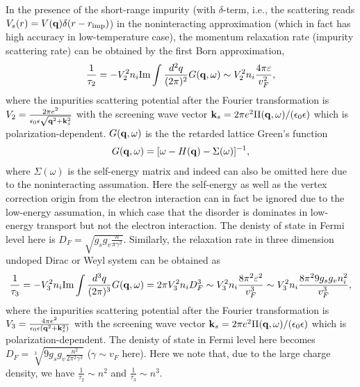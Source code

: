 \documentclass[UTF8,a4paper]{article}
\begin{document}
\begin{large}
In the presence of the short-range impurity (with $\delta$-term, i.e., the scattering reads $V_{s}(r)=V({\bf q})\delta(r-r_{{\rm imp}})$) 
in the noninteracting approximation
(which in fact has high accuracy in low-temperature case),
the momentum relaxation rate (impurity scattering rate) can be obtained by the first Born approximation,
\begin{equation} 
\begin{aligned}
\frac{1}{\tau_{2}}=-V^{2}_{2}n_{i}{\rm Im}\int\frac{d^{2}q}{(2\pi)^{2}}G({\bf q},\omega)
\sim V^{2}_{2}n_{i}\frac{4\pi\varepsilon}{v_{F}^{2}},
\end{aligned}
\end{equation}
where
the impurities scattering potential after the Fourier transformation is $V_{2}=\frac{2\pi e^{2}}
{\epsilon_{0}\epsilon\sqrt{{\bf q}^{2}+{\bf k}_{s}^{2}}}$
with the screening wave vector ${\bf k}_{s}=2\pi e^{2}\Pi({\bf q},\omega)/(\epsilon_{0}\epsilon)$ which is polarization-dependent.
$G({\bf q},\omega)$ is the the retarded lattice Green's function
\begin{equation} 
\begin{aligned}
G({\bf q},\omega)=[\omega-H({\bf q})-\Sigma(\omega)]^{-1},
\end{aligned}
\end{equation}
where $\Sigma(\omega)$ is the self-energy matrix
and indeed can also be omitted here due to the noninteracting assumation.
Here the self-energy as well as the vertex correction origin from the electron interaction can in fact be ignored due to the low-energy
assumation,
in which case that the disorder is dominates in low-energy transport but not the electron interaction\cite{Burkov A A}.
The denisty of state in Fermi level here is $D_{F}=\sqrt{g_{s}g_{v}\frac{n}{\pi\gamma^{2}}}$.
Similarly, the relaxation rate in three dimension undoped Dirac or Weyl system can be obtained as
\begin{equation} 
\begin{aligned}
\frac{1}{\tau_{3}}=-V_{3}^{2}n_{i}{\rm Im}\int\frac{d^{3}q}{(2\pi)^{3}}G({\bf q},\omega)=2\pi V_{3}^{2}n_{i}D_{F}^{3}
\sim V_{3}^{2}n_{i}\frac{8\pi^{2}\varepsilon^{2}}{v^{3}_{F}}
\sim V_{3}^{2}n_{i}\frac{8\pi^{2}9g_{s}g_{v}n_{i}^{2}}{v^{3}_{F}},
\end{aligned}
\end{equation}
where
the impurities scattering potential after the Fourier transformation is $V_{3}=\frac{4\pi e^{2}}
{\epsilon_{0}\epsilon({\bf q}^{2}+{\bf k}_{s}^{2})}$
with the screening wave vector ${\bf k}_{s}=2\pi e^{2}\Pi({\bf q},\omega)/(\epsilon_{0}\epsilon)$ which is polarization-dependent.
The denisty of state in Fermi level here becomes $D_{F}=\sqrt[3]{9g_{s}g_{v}\frac{n^{2}}{2\pi^{2}\gamma^{3}}}$
($\gamma\sim v_{F}$ here).
Here we note that, due to the large charge density,
we have $\frac{1}{\tau_{2}}\sim n^{2}$ and $\frac{1}{\tau_{3}}\sim n^{3}$. 


\end{large}
\end{document}

